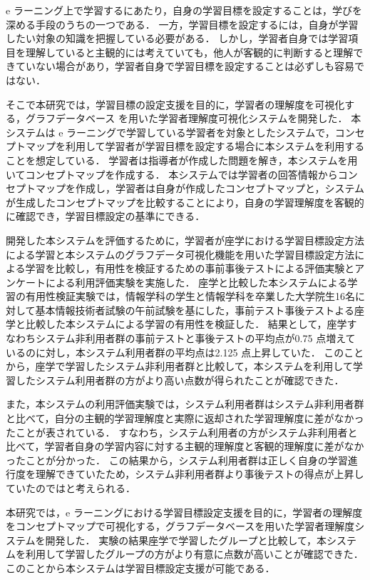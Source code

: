 e ラーニング上で学習するにあたり，自身の学習目標を設定することは，学びを深める手段のうちの一つである．
一方，学習目標を設定するには，自身が学習したい対象の知識を把握している必要がある．
しかし，学習者自身では学習項目を理解していると主観的には考えていても，他人が客観的に判断すると理解できていない場合があり，学習者自身で学習目標を設定することは必ずしも容易ではない．

そこで本研究では，学習目標の設定支援を目的に，学習者の理解度を可視化する，グラフデータベース を用いた学習者理解度可視化システムを開発した．
本システムは e ラーニングで学習している学習者を対象としたシステムで，コンセプトマップを利用して学習者が学習目標を設定する場合に本システムを利用することを想定している．
学習者は指導者が作成した問題を解き，本システムを用いてコンセプトマップを作成する．
本システムでは学習者の回答情報からコンセプトマップを作成し，学習者は自身が作成したコンセプトマップと，システムが生成したコンセプトマップを比較することにより，自身の学習理解度を客観的に確認でき，学習目標設定の基準にできる．

開発した本システムを評価するために，学習者が座学における学習目標設定方法による学習と本システムのグラフデータ可視化機能を用いた学習目標設定方法による学習を比較し，有用性を検証するための事前事後テストによる評価実験とアンケートによる利用評価実験を実施した．
座学と比較した本システムによる学習の有用性検証実験では，情報学科の学生と情報学科を卒業した大学院生16名に対して基本情報技術者試験の午前試験を基にした，事前テスト事後テストよる座学と比較した本システムによる学習の有用性を検証した．
結果として，座学すなわちシステム非利用者群の事前テストと事後テストの平均点が0.75 点増えているのに対し，本システム利用者群の平均点は2.125 点上昇していた．
このことから，座学で学習したシステム非利用者群と比較して，本システムを利用して学習したシステム利用者群の方がより高い点数が得られたことが確認できた．

また，本システムの利用評価実験では，システム利用者群はシステム非利用者群と比べて，自分の主観的学習理解度と実際に返却された学習理解度に差がなかったことが表されている．
すなわち，システム利用者の方がシステム非利用者と比べて，学習者自身の学習内容に対する主観的理解度と客観的理解度に差がなかったことが分かった．
この結果から，システム利用者群は正しく自身の学習進行度を理解できていたため，システム非利用者群より事後テストの得点が上昇していたのではと考えられる．

本研究では，e ラーニングにおける学習目標設定支援を目的に，学習者の理解度をコンセプトマップで可視化する，グラフデータベースを用いた学習者理解度システムを開発した．
実験の結果座学で学習したグループと比較して，本システムを利用して学習したグループの方がより有意に点数が高いことが確認できた．
このことから本システムは学習目標設定支援が可能である．